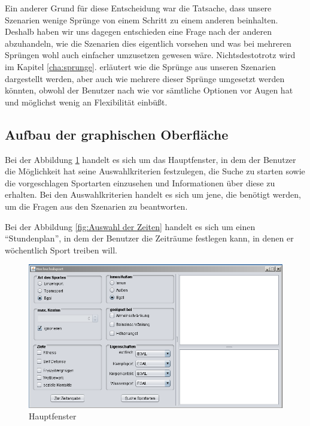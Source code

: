 Ein anderer Grund für diese Entscheidung war die Tatsache, dass unsere Szenarien wenige Sprünge von einem Schritt zu einem anderen beinhalten. Deshalb haben wir uns dagegen entschieden eine Frage nach der anderen abzuhandeln, wie die Szenarien dies eigentlich vorsehen und was bei mehreren Sprüngen wohl auch einfacher umzusetzen gewesen wäre. Nichtsdestotrotz wird im Kapitel \ref{cha:sprunge}.  erläutert wie die Sprünge aus unseren Szenarien dargestellt werden, aber auch wie mehrere dieser Sprünge umgesetzt werden könnten, obwohl der Benutzer nach wie vor sämtliche Optionen vor Augen hat und möglichst wenig an Flexibilität einbüßt.

\subsection{Aufbau der graphischen Oberfläche}

Bei der Abbildung \ref{fig:Hauptfenster} handelt es sich um das Hauptfenster, in dem der Benutzer die Möglichkeit hat seine Auswahlkriterien festzulegen, die Suche zu starten sowie die vorgeschlagen Sportarten einzusehen und Informationen über diese zu erhalten. Bei den Auswahlkriterien handelt es sich um jene, die benötigt werden, um die Fragen aus den Szenarien zu beantworten.

Bei der Abbildung \ref{fig:Auswahl der Zeiten} handelt es sich um einen "`Stundenplan"', in dem der Benutzer die Zeiträume festlegen kann, in denen er wöchentlich Sport treiben will. 



\begin{figure}[p]
\centering
\includegraphics[width=\textwidth]{images/gui.png}%
\caption{Hauptfenster}
\label{fig:Hauptfenster}
\end{figure}


